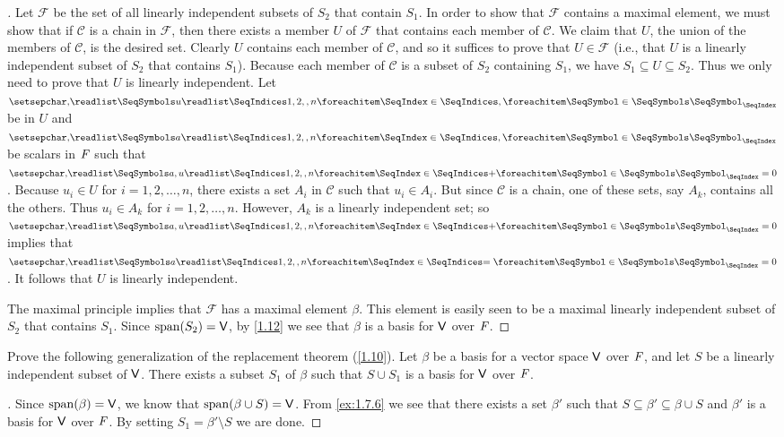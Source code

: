 \begin{proof}[]
	Let \(\mathcal{F}\) be the set of all linearly independent subsets of \(S_2\) that contain \(S_1\).
	In order to show that \(\mathcal{F}\) contains a maximal element, we must show that if \(\mathcal{C}\) is a chain in \(\mathcal{F}\), then there exists a member \(U\) of \(\mathcal{F}\) that contains each member of \(\mathcal{C}\).
	We claim that \(U\), the union of the members of \(\mathcal{C}\), is the desired set.
	Clearly \(U\) contains each member of \(\mathcal{C}\), and so it suffices to prove that \(U \in \mathcal{F}\)
	(i.e., that \(U\) is a linearly independent subset of \(S_2\) that contains \(S_1\)).
	Because each member of \(\mathcal{C}\) is a subset of \(S_2\) containing \(S_1\), we have \(S_1 \subseteq U \subseteq S_2\).
	Thus we only need to prove that \(U\) is linearly independent.
	Let \(\seq{u}{1,2,,n}\) be in \(U\) and \(\seq{a}{1,2,,n}\) be scalars in \(\mathit{F}\) such that \(\seq[+]{a,u}{1,2,,n} = 0\).
	Because \(u_i \in U\) for \(i = 1, 2, \dots, n\), there exists a set \(A_i\) in \(\mathcal{C}\) such that \(u_i \in A_i\).
	But since \(\mathcal{C}\) is a chain, one of these sets, say \(A_k\), contains all the others.
	Thus \(u_i \in A_k\) for \(i = 1, 2, \dots, n\).
	However, \(A_k\) is a linearly independent set;
	so \(\seq[+]{a,u}{1,2,,n} = 0\) implies that \(\seq[=]{a}{1,2,,n} = 0\).
	It follows that \(U\) is linearly independent.

	The maximal principle implies that \(\mathcal{F}\) has a maximal element \(\beta\).
	This element is easily seen to be a maximal linearly independent subset of \(S_2\) that contains \(S_1\).
	Since \(\spn{S_2} = \V\), by \cref{1.12} we see that \(\beta\) is a basis for \(\mathsf{V}\) over \(\mathit{F}\).
\end{proof}

\begin{ex}\label{ex:1.7.7}
	Prove the following generalization of the replacement theorem (\cref{1.10}).
	Let \(\beta\) be a basis for a vector space \(\mathsf{V}\) over \(\mathit{F}\), and let \(S\) be a linearly independent subset of \(\mathsf{V}\).
	There exists a subset \(S_1\) of \(\beta\) such that \(S \cup S_1\) is a basis for \(\mathsf{V}\) over \(\mathit{F}\).
\end{ex}

\begin{proof}[]
	Since \(\spn{\beta} = \V\), we know that \(\spn{\beta \cup S} = \V\).
	From \cref{ex:1.7.6} we see that there exists a set \(\beta'\) such that \(S \subseteq \beta' \subseteq \beta \cup S\) and \(\beta'\) is a basis for \(\mathsf{V}\) over \(\mathit{F}\).
	By setting \(S_1 = \beta' \setminus S\) we are done.
\end{proof}
